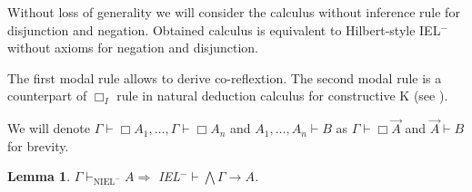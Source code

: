 \documentclass[a4paper]{article}
\newtheorem{lemma}{Lemma}
\begin{document}
Without loss of generality we will consider the calculus without inference rule for disjunction and negation.
Obtained calculus is equivalent to Hilbert-style IEL$^{-}$ without axioms for negation and disjunction.

The first modal rule allows to derive co-reflextion. The second modal rule is a counterpart of $\Box_I$
rule in natural deduction calculus for constructive K (see \cite{ModalLa}).

We will denote $\Gamma \vdash \Box A_1, \dots, \Gamma \vdash \Box A_n$ and $A_1,\dots,A_n \vdash B$ as $\Gamma \vdash \Box \vec{A}$ and $\vec{A} \vdash B$ for brevity.

  \vspace{\baselineskip}

  \begin{lemma}
    $\Gamma \vdash_{\text{NIEL}^{-}} A \Rightarrow$ IEL$^{-} \vdash \bigwedge \Gamma \rightarrow A$.
  \end{lemma}
\end{document}
